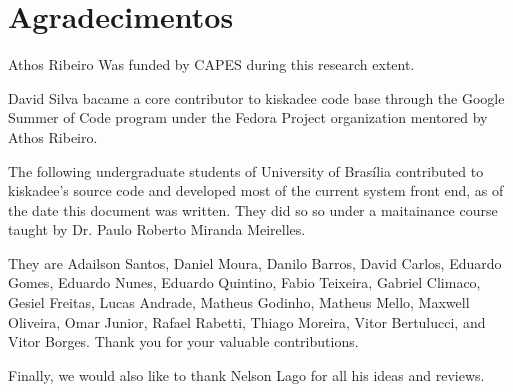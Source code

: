 \chapter*{Agradecimentos}

Athos Ribeiro Was funded by CAPES during this research extent.

David Silva bacame a core contributor to kiskadee code base through the Google
Summer of Code program under the Fedora Project organization mentored by Athos
Ribeiro.

The following undergraduate students of University of Brasília contributed to
kiskadee's source code and developed most of the current system front end, as of
the date this document was written. They did so so under a maitainance course
taught by Dr. Paulo Roberto Miranda Meirelles.

They are Adailson Santos,
Daniel Moura,
Danilo Barros,
David Carlos,
Eduardo Gomes,
Eduardo Nunes,
Eduardo Quintino,
Fabio Teixeira,
Gabriel Climaco,
Gesiel Freitas,
Lucas Andrade,
Matheus Godinho,
Matheus Mello,
Maxwell Oliveira,
Omar Junior,
Rafael Rabetti,
Thiago Moreira,
Vitor Bertulucci, and
Vitor Borges.
Thank you for your valuable contributions.

Finally, we would also like to thank Nelson Lago for all his ideas and reviews.

